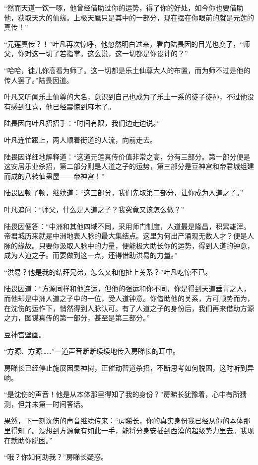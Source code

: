 \begin{this_body}
“然而天道一饮一啄，他曾经借助过你的运势，得了你的好处，如今你也要借助他，获取天大的仙缘。上极天鹰只是其中的一部分，现在摆在你眼前的就是元莲的真传！”

“元莲真传？！”叶凡再次惊呼，他忽然明白过来，看向陆畏因的目光也变了，“师父，你对这一切了若指掌。这么说，这一切都是你设计的？”

“哈哈，徒儿你高看为师了。这一切都是乐土仙尊大人的布置，而为师不过是他的传人罢了。”陆畏因道。

叶凡又听闻乐土仙尊的大名，意识到自己也成为了乐土一系的徒子徒孙，不过他没有感到狂喜，他已经震惊到麻木了。

陆畏因向叶凡招招手：“时间有限，我们边走边说。”

叶凡连忙跟上，两人顺着街道的人流，向前走去。

陆畏因详细地解释道：“这道元莲真传价值非常之高，分有三部分。第一部分便是这安居乐业杀招，第二部分则是人道之子的运势，第三部分是豆神宫和帝君城组建而成的八转仙蛊屋——帝神宫！”

陆畏因顿了顿，继续道：“这三部分，我们先取第二部分，让你成为人道之子。”

叶凡追问：“师父，什么是人道之子？我究竟又该怎么做？”

陆畏因便答：“中洲和其他四域不同，采用师门制度，人道最是隆昌，积累雄浑。帝君城历来就是中洲地表人脉的最大集结点。这里为何出产涌现无数人才？便是人脉的缘故。只要你汲取人脉中的力量，便能极大助长你的运势，得到人道的钟意，成为人道之子。而要做到这一点，还得借助洪易的力量。”

“洪易？他是我的结拜兄弟，怎么又和他扯上关系？”叶凡吃惊不已。

陆畏因道：“方源同样和他连运，但他的强运和你不同，你是得到天道垂青之人，而他却是中洲人道之子中的一位，受人道钟意。你借助他的关系，方可顺势而为，在沈伤的运作下，悄然得到人脉认可。有了人道之子的身份后，我们再来借助方源之力，图谋真传的第一部分，甚至是第三部分。”

豆神宫壁画。

“方源、方源……”一道声音断断续续地传入房睇长的耳中。

房睇长已经停止施展因果神树，正催动智道杀招，不断思考如何脱困，这时听到异响。

“是沈伤的声音！他是从本体那里得知了我的身份？”房睇长犹豫着，心中有所猜测，但并未第一时间答话。

果然，下一刻沈伤的声音继续传来：“房睇长，你的真实身份我已经从你的本体那里得知了。没想到方源竟有如此一手，能将分身安插到西漠的超级势力里去。我现在就助你脱困。”

“哦？你如何助我？”房睇长疑惑。


\end{this_body}
